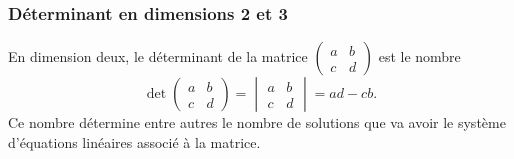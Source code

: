 \subsubsection{Déterminant en dimensions 2 et 3}

En dimension deux, le déterminant de la matrice
    $\begin{pmatrix}
        a    &   b    \\
        c    &   d
    \end{pmatrix}$
est le nombre
\begin{equation}        \label{EQooQRGVooChwRMd}
     \det\begin{pmatrix}
         a   &   b    \\
         c   &   d
     \end{pmatrix}=\begin{vmatrix}
          a  &   b    \\
        c    &   d
    \end{vmatrix}=ad-cb.
\end{equation}
Ce nombre détermine entre autres le nombre de solutions que va avoir le système d'équations linéaires associé à la matrice.

